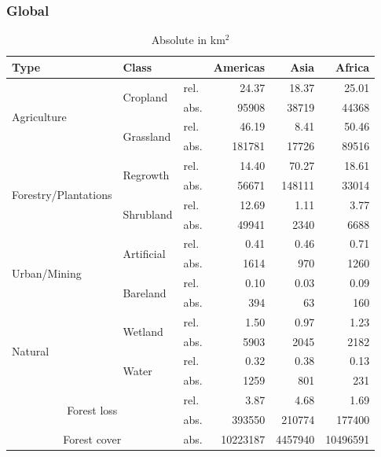 		\subsubsection{Global}
			\begin{table}[ht]
				\centering
				\caption[Deforestation driver]{Absolute in km$^2$}
				\label{tab:driver_tab}
				\begin{tabular}{lllrrr} 	Type & Class & & Americas & Asia & Africa \\\hline
					\multirow{4}{*}{Agriculture} & \multirow{2}{*}{Cropland} & rel. & 24.37 & 18.37 & 25.01 \\
					& & abs. & 95908 & 38719 & 44368 \\
					& \multirow{2}{*}{Grassland} & rel. & 46.19 & 8.41 & 50.46 \\
					& & abs. & 181781 & 17726 & 89516 \\
					\multirow{4}{*}{Forestry/Plantations} & \multirow{2}{*}{Regrowth} & rel. & 14.40 & 70.27 & 18.61 \\
					& & abs. & 56671 & 148111 & 33014 \\
					& \multirow{2}{*}{Shrubland} & rel. & 12.69 & 1.11 & 3.77 \\
					& & abs. & 49941 & 2340 & 6688 \\
					\multirow{4}{*}{Urban/Mining} & \multirow{2}{*}{Artificial} & rel. & 0.41 & 0.46 & 0.71 \\
					& & abs. & 1614 & 970 & 1260 \\
					& \multirow{2}{*}{Bareland} & rel. & 0.10 & 0.03 & 0.09 \\
					& & abs. & 394 & 63 & 160 \\
					\multirow{4}{*}{Natural} & \multirow{2}{*}{Wetland} & rel. & 1.50 & 0.97 & 1.23 \\
					& & abs. & 5903 & 2045 & 2182 \\
					& \multirow{2}{*}{Water} & rel. & 0.32 & 0.38 & 0.13 \\
					& & abs. & 1259 & 801 & 231 \\\hline
					\multicolumn{2}{c}{\multirow{2}{*}{Forest loss}} & rel. & 3.87 & 4.68 & 1.69 \\
					& & abs. & 393550 & 210774 & 177400 \\
					\multicolumn{2}{c}{Forest cover} & abs. & 10223187 & 4457940 & 10496591 \\\hline
				\end{tabular}
			\end{table}

